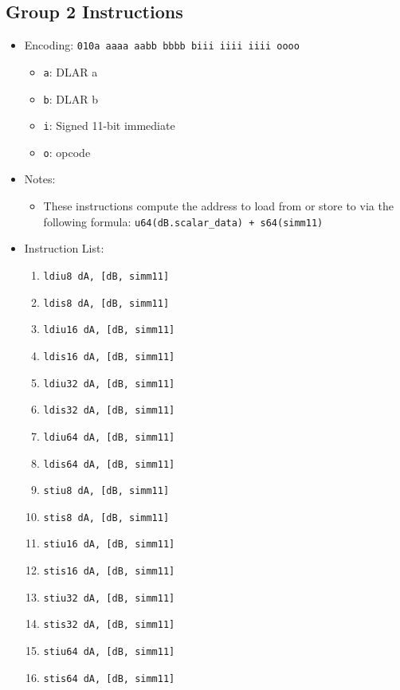 \documentclass{article}
\begin{document}
	\subsection{Group 2 Instructions}
		\begin{itemize}
		\item Encoding:  \texttt{010a aaaa aabb bbbb  biii iiii iiii oooo}
			\begin{itemize}
			\item \texttt{a}:  DLAR a
			\item \texttt{b}:  DLAR b
			\item \texttt{i}:  Signed 11-bit immediate
			\item \texttt{o}:  opcode
			\end{itemize}
		\item Notes:
			\begin{itemize}
			\item These instructions compute the address to load from or
				store to via the following formula:
				\texttt{u64(dB.scalar\_data) + s64(simm11)}
			\end{itemize}
		\item Instruction List:
			\begin{enumerate}
			\item \texttt{ldiu8 dA, [dB, simm11]}
			\item \texttt{ldis8 dA, [dB, simm11]}
			\item \texttt{ldiu16 dA, [dB, simm11]}
			\item \texttt{ldis16 dA, [dB, simm11]}

			\item \texttt{ldiu32 dA, [dB, simm11]}
			\item \texttt{ldis32 dA, [dB, simm11]}
			\item \texttt{ldiu64 dA, [dB, simm11]}
			\item \texttt{ldis64 dA, [dB, simm11]}

			\item \texttt{stiu8 dA, [dB, simm11]}
			\item \texttt{stis8 dA, [dB, simm11]}
			\item \texttt{stiu16 dA, [dB, simm11]}
			\item \texttt{stis16 dA, [dB, simm11]}

			\item \texttt{stiu32 dA, [dB, simm11]}
			\item \texttt{stis32 dA, [dB, simm11]}
			\item \texttt{stiu64 dA, [dB, simm11]}
			\item \texttt{stis64 dA, [dB, simm11]}
			\end{enumerate}
		\end{itemize}
\end{document}
